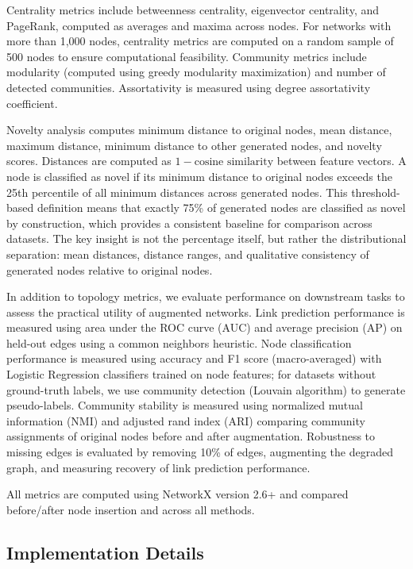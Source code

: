 \documentclass[12pt]{article}
\begin{document}
Centrality metrics include betweenness centrality, eigenvector centrality, and PageRank, computed as averages and maxima across nodes. For networks with more than 1,000 nodes, centrality metrics are computed on a random sample of 500 nodes to ensure computational feasibility. Community metrics include modularity (computed using greedy modularity maximization) and number of detected communities. Assortativity is measured using degree assortativity coefficient.

Novelty analysis computes minimum distance to original nodes, mean distance, maximum distance, minimum distance to other generated nodes, and novelty scores. Distances are computed as $1 - \text{cosine similarity}$ between feature vectors. A node is classified as novel if its minimum distance to original nodes exceeds the 25th percentile of all minimum distances across generated nodes. This threshold-based definition means that exactly 75\% of generated nodes are classified as novel by construction, which provides a consistent baseline for comparison across datasets. The key insight is not the percentage itself, but rather the distributional separation: mean distances, distance ranges, and qualitative consistency of generated nodes relative to original nodes.

In addition to topology metrics, we evaluate performance on downstream tasks to assess the practical utility of augmented networks. Link prediction performance is measured using area under the ROC curve (AUC) and average precision (AP) on held-out edges using a common neighbors heuristic. Node classification performance is measured using accuracy and F1 score (macro-averaged) with Logistic Regression classifiers trained on node features; for datasets without ground-truth labels, we use community detection (Louvain algorithm) to generate pseudo-labels. Community stability is measured using normalized mutual information (NMI) and adjusted rand index (ARI) comparing community assignments of original nodes before and after augmentation. Robustness to missing edges is evaluated by removing 10\% of edges, augmenting the degraded graph, and measuring recovery of link prediction performance.

All metrics are computed using NetworkX \cite{hagberg2008exploring} version 2.6+ and compared before/after node insertion and across all methods.

\subsection{Implementation Details}
\end{document}
